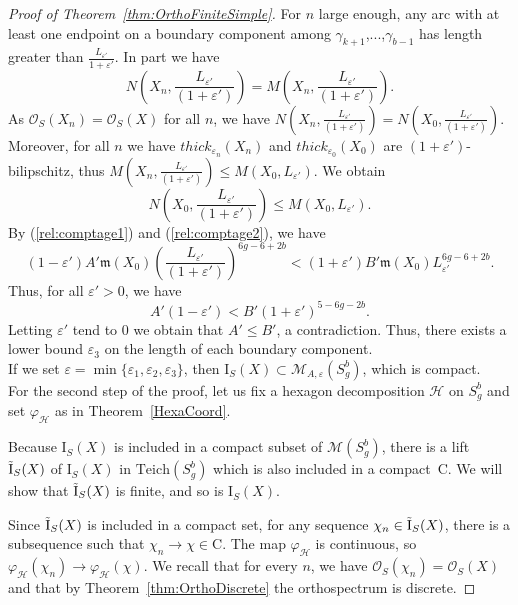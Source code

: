 \documentclass[a4paper,12pt]{article}
\theoremstyle{definition}
\theoremstyle{remark}
\begin{document}
\begin{proof}[Proof of Theorem~\ref{thm:OrthoFiniteSimple}]
    For $n$ large enough, any arc with at least one endpoint on a boundary component among $\gamma_{k+1}$,...,$\gamma_{b-1}$ has length greater than $\frac{L_{\varepsilon'}}{1+\varepsilon'} $. In part we have 
    \[
        N \left( X_n, \frac{L_{\varepsilon'}}{(1+\varepsilon')} \right) = M\left( X_n,\frac{L_{\varepsilon'}}{(1+\varepsilon')} \right).
    \]
    As $\mathcal{O}_S(X_n)=\mathcal{O}_S(X)$ for all $n$, we have $N \left( X_n, \frac{L_{\varepsilon'}}{(1+\varepsilon')} \right) = N \left( X_0, \frac{L_{\varepsilon'}}{(1+\varepsilon')} \right)$. Moreover, for all $n$ we have $thick_{\varepsilon_n}(X_n)$ and $thick_{\varepsilon_0}(X_0)$ are $(1+\varepsilon')$-bilipschitz, thus $M\left( X_n,\frac{L_{\varepsilon'}}{(1+\varepsilon')} \right) \leqslant M(X_0,L_{\varepsilon'})$. We obtain
    \[
        N \left( X_0, \frac{L_{\varepsilon'}}{(1+\varepsilon')} \right) \leqslant M(X_0,L_{\varepsilon'}).
    \]
    By (\ref{rel:comptage1}) and (\ref{rel:comptage2}), we have
    \[
        (1-\varepsilon')A'\mathfrak{m}(X_0)\left( \frac{L_{\varepsilon'}}{(1+\varepsilon')} \right)^{6g-6+2b} < (1+\varepsilon')B'\mathfrak{m}(X_0) L_{\varepsilon'}^{6g-6+2b}.
    \]
    Thus, for all $\varepsilon'>0$, we have
    \[
        A' (1-\varepsilon') < B'(1+\varepsilon')^{5-6g-2b}.
    \]
    Letting $\varepsilon'$ tend to $0$ we obtain that $A' \leqslant B'$, a contradiction. Thus, there exists a lower bound $\varepsilon_3$ on the length of each boundary component.\\
    If we set $\varepsilon = \min \{ \varepsilon_1, \varepsilon_2, \varepsilon_3 \}$, then $\mathrm{I}_S(X) \subset \mathcal{M}_{A, \varepsilon}(S_g^b)$, which is compact.\\
    
    
    For the second step of the proof, let us fix a hexagon decomposition $\mathcal{H}$ on $S_g^b$ and set $\varphi_{\mathcal{H}}$ as in Theorem~\ref{HexaCoord}.

    Because $\mathrm{I}_S(X)$ is included in a compact subset of $\mathcal{M}(S_g^b)$, there is a lift $\Tilde{\mathrm{I}}_S(X)$ of $\mathrm{I}_S(X)$ in $\mathrm{Teich}(S_g^b)$ which is also included in a compact~$\mathrm{C}$. We will show that $\Tilde{\mathrm{I}}_S(X)$ is finite, and so is $\mathrm{I}_S(X)$.
    
    Since $\Tilde{\mathrm{I}}_S(X)$ is included in a compact set, for any sequence $\chi_n \in \Tilde{\mathrm{I}}_S(X)$, there is a subsequence such that $\chi_n \to \chi \in \mathrm{C}$. The map $\varphi_{\mathcal{H}}$ is continuous, so \mbox{$ \varphi_{\mathcal{H}}(\chi_n) \to \varphi_{\mathcal{H}}(\chi)$}. We recall that for every $n$, we have $\mathcal{O}_S(\chi_n)=\mathcal{O}_S(X)$ and that by Theorem~\ref{thm:OrthoDiscrete} the orthospectrum is discrete. 
    

\end{proof}
\end{document}
